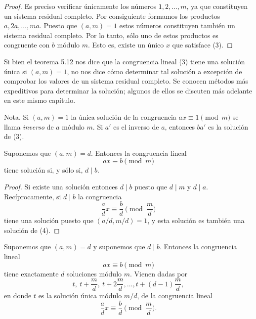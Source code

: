 \documentclass[12pt,a4paper]{book}
\begin{document}
    \begin{proof}
        Es preciso verificar únicamente los números $1,2,\dots,m$, ya que constituyen un
        sistema residual completo. Por consiguiente formamos los productos
        $a,2a,\dots,ma$. Puesto que $(a,m)=1$ estos números constituyen también un
        sistema residual completo. Por lo tanto, sólo uno de estos productos es
        congruente con $b$ módulo $m$. Esto es, existe un único $x$ que satisface (3).
    \end{proof}

    Si bien el teorema 5.12 nos dice que la congruencia lineal (3) tiene una solución
    única si $(a,m)=1$, no nos dice cómo determinar tal solución a excepción de
    comprobar los valores de un sistema residual completo. Se conocen métodos más
    expeditivos para determinar la solución; algunos de ellos se discuten más adelante
    en este mismo capítulo.

    Nota. Si $(a,m)=1$ la única solución de la congruencia $ax\equiv1\pmod{m}$ se llama
    \textit{inverso} de $a$ módulo $m$. Si $a'$ es el inverso de $a$, entonces $ba'$ es\label{sim:ainv}
    la solución de (3).

    \begin{teorema}
        Suponemos que $(a,m)=d$. Entonces la congruencia lineal
        \begin{equation}
            ax\equiv b\pmod{m}
        \end{equation}
        tiene solución si, y sólo si, $d\mid b$.
    \end{teorema}

    \begin{proof}
        Si existe una solución entonces $d\mid b$ puesto que $d\mid m$ y $d\mid a$.
        Recíprocamente, si $d\mid b$ la congruencia
        \begin{equation*}
            \frac{a}{d}x\equiv\frac{b}{d}\pmod{\frac{m}{d}}
        \end{equation*}
        tiene una solución puesto que $(a/d,m/d)=1$, y esta solución es también una
        solución de (4).
    \end{proof}

    \begin{teorema}
        Suponemos que $(a,m)=d$ y suponemos que $d\mid b$. Entonces la congruencia lineal
        \begin{equation}
            ax\equiv b\pmod{m}
        \end{equation}
        tiene exactamente $d$ soluciones módulo $m$. Vienen dadas por
        \begin{equation}
            t,\ t+\frac{m}{d},\ t+2\frac{m}{d},\dots,t+(d-1)\frac{m}{d},
        \end{equation}
        en donde $t$ es la solución única módulo $m/d$, de la congruencia lineal
        \begin{equation}
            \frac{a}{d}x\equiv\frac{b}{d}\pmod{\frac{m}{d}}.
        \end{equation}
    \end{teorema}
\end{document}
